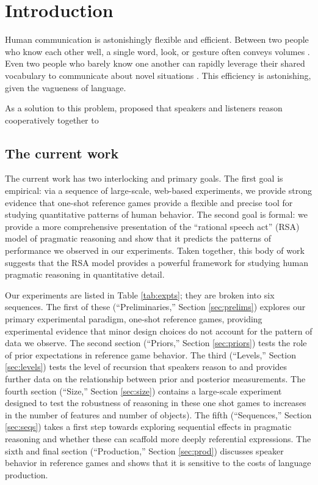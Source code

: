 \section{Introduction}

Human communication is astonishingly flexible and efficient. Between two people who know each other well, a single word, look, or gesture often conveys volumes \cite{grice1975,sperber1986,clark1996}. Even two people who barely know one another can rapidly leverage their shared vocabulary to communicate about novel situations \cite{brennan1993}.  This efficiency is astonishing, given the vagueness of language. 

As a solution to this problem,  proposed that speakers and listeners reason cooperatively together to 


\subsection{The current work}

The current work has two interlocking and primary goals. The first goal is empirical: via a sequence of large-scale, web-based experiments, we provide strong evidence that one-shot reference games provide a flexible and precise tool for studying quantitative patterns of human behavior. The second goal is formal: we provide a more comprehensive presentation of the ``rational speech act'' (RSA) model of pragmatic reasoning and show that it predicts the patterns of performance we observed in our experiments. Taken together, this body of work suggests that the RSA model provides a powerful framework for studying human pragmatic reasoning in quantitative detail. 

Our experiments are listed in Table \ref{tab:expts}; they are broken into six sequences. The first of these (``Preliminaries,'' Section \ref{sec:prelims}) explores our primary experimental paradigm, one-shot reference games, providing experimental evidence that minor design choices do not account for the pattern of data we observe. The second section (``Priors,'' Section \ref{sec:priors}) tests the role of prior expectations in reference game behavior. The third (``Levels,'' Section \ref{sec:levels}) tests the level of recursion that speakers reason to and provides further data on the relationship between prior and posterior measurements. The fourth section (``Size,'' Section \ref{sec:size}) contains a large-scale experiment designed to test the robustness of reasoning in these one shot games to increases in the number of features and number of objects). The fifth (``Sequences,'' Section \ref{sec:seqs}) takes a first step towards exploring sequential effects in pragmatic reasoning and whether these can scaffold more deeply referential expressions. The sixth and final section (``Production,'' Section \ref{sec:prod}) discusses speaker behavior in reference games and shows that it is sensitive to the costs of language production. 

